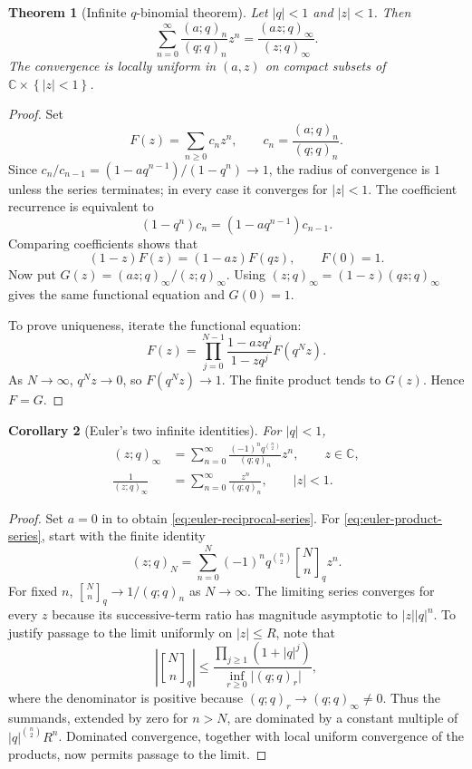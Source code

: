 \documentclass[11pt,oneside,openany]{book}
\newtheorem{theorem}{Theorem}[chapter]
\newtheorem{corollary}[theorem]{Corollary}
\theoremstyle{definition}
\theoremstyle{remark}
\newcommand{\Qbinom}[3]{\genfrac{[}{]}{0pt}{}{#1}{#2}_{#3}}
\newcommand{\C}{\mathbb C}
\newcommand{\abs}[1]{\lvert #1\rvert}
\newcommand{\set}[1]{\left\{#1\right\}}
\begin{document}
\begin{theorem}[Infinite $q$-binomial theorem]\label{thm:infinite-qbinomial}
Let $\abs q<1$ and $\abs z<1$.  Then
\[
 \sum_{n=0}^{\infty}\frac{(a;q)_n}{(q;q)_n}z^n
 =\frac{(az;q)_\infty}{(z;q)_\infty}.
\]
The convergence is locally uniform in $(a,z)$ on compact subsets of $\C\times\set{\abs z<1}$.
\end{theorem}

\begin{proof}
Set
\[
 F(z)=\sum_{n\ge0}c_nz^n,
 \qquad c_n=\frac{(a;q)_n}{(q;q)_n}.
\]
Since $c_{n}/c_{n-1}=(1-aq^{n-1})/(1-q^n)\to1$, the radius of convergence is $1$ unless the series terminates; in every case it converges for $\abs z<1$.  The coefficient recurrence is equivalent to
\[
 (1-q^n)c_n=(1-aq^{n-1})c_{n-1}.
\]
Comparing coefficients shows that
\[
 (1-z)F(z)=(1-az)F(qz),\qquad F(0)=1.\label{eq:qbinom-fe}
\]
Now put
\(
 G(z)=(az;q)_\infty/(z;q)_\infty.
\)
Using $(z;q)_\infty=(1-z)(qz;q)_\infty$ gives the same functional equation and $G(0)=1$.

To prove uniqueness, iterate the functional equation:
\[
 F(z)=\prod_{j=0}^{N-1}\frac{1-azq^j}{1-zq^j}F(q^Nz).
\]
As $N\to\infty$, $q^Nz\to0$, so $F(q^Nz)\to1$.  The finite product tends to $G(z)$.  Hence $F=G$.
\end{proof}

\begin{corollary}[Euler's two infinite identities]\label{cor:euler-infinite}
For $\abs q<1$,
\begin{align}
 (z;q)_\infty
 &=\sum_{n=0}^{\infty}\frac{(-1)^nq^{\binom n2}}{(q;q)_n}z^n,
 \qquad z\in\C,\label{eq:euler-product-series}\\
 \frac1{(z;q)_\infty}
 &=\sum_{n=0}^{\infty}\frac{z^n}{(q;q)_n},
 \qquad \abs z<1.\label{eq:euler-reciprocal-series}
\end{align}
\end{corollary}

\begin{proof}
Set $a=0$ in  to obtain \eqref{eq:euler-reciprocal-series}.  For \eqref{eq:euler-product-series}, start with the finite identity
\[
 (z;q)_N=\sum_{n=0}^{N}(-1)^nq^{\binom n2}\Qbinom Nnq z^n.
\]
For fixed $n$, $\Qbinom Nnq\to1/(q;q)_n$ as $N\to\infty$.  The limiting series converges for every $z$ because its successive-term ratio has magnitude asymptotic to $\abs z\abs q^n$.  To justify passage to the limit uniformly on $\abs z\le R$, note that
\[
 \left|\Qbinom Nnq\right|
 \le
 \frac{\prod_{j\ge1}(1+\abs q^j)}
      {\inf_{r\ge0}\abs{(q;q)_r}},
\]
where the denominator is positive because $(q;q)_r\to(q;q)_\infty\ne0$.  Thus the summands, extended by zero for $n>N$, are dominated by a constant multiple of $\abs q^{\binom n2}R^n$.  Dominated convergence, together with local uniform convergence of the products, now permits passage to the limit.
\end{proof}
\end{document}
